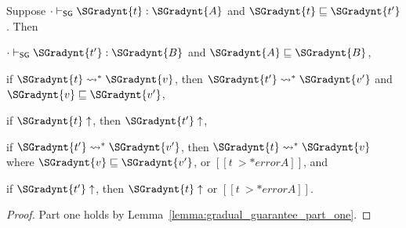 \begin{theorem}
  \label{thm:gradual_guarantee}
  Suppose $  \cdot   \vdash_{\mathsf{SG} }  \SGradynt{t}  :  \SGradynt{A} $ and $ \SGradynt{t}  \sqsubseteq  \SGradynt{t'} $.  Then
  \begin{enumR}
  \item $  \cdot   \vdash_{\mathsf{SG} }  \SGradynt{t'}  :  \SGradynt{B} $ and $ \SGradynt{A}  \sqsubseteq  \SGradynt{B} $,
  \item if $ \SGradynt{t}  \rightsquigarrow^*  \SGradynt{v} $, then $ \SGradynt{t'}  \rightsquigarrow^*  \SGradynt{v'} $ and $ \SGradynt{v}  \sqsubseteq  \SGradynt{v'} $,
  \item if $ \SGradynt{t}  \uparrow $, then $ \SGradynt{t'}  \uparrow $,
  \item if $ \SGradynt{t'}  \rightsquigarrow^*  \SGradynt{v'} $, then $ \SGradynt{t}  \rightsquigarrow^*  \SGradynt{v} $ where $ \SGradynt{v}  \sqsubseteq  \SGradynt{v'} $, or $[[t ~>* error A]]$, and
  \item if $ \SGradynt{t'}  \uparrow $, then $ \SGradynt{t}  \uparrow $ or $[[t ~>* error A]]$.
  \end{enumR}
\end{theorem}
\begin{proof}
  Part one holds by Lemma~\ref{lemma:gradual_guarantee_part_one}.
\end{proof}

